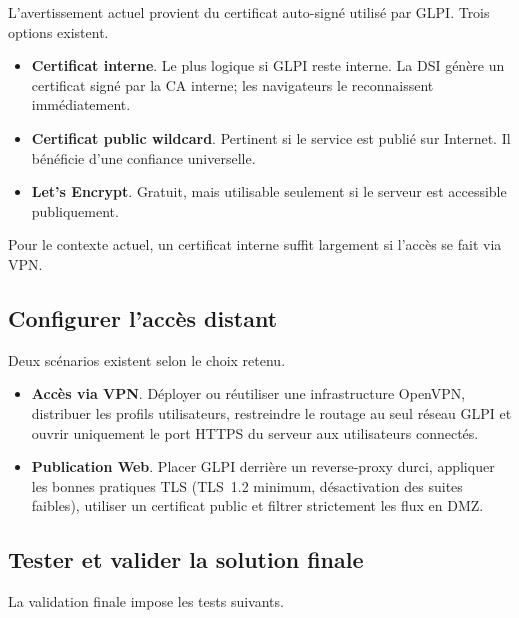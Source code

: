 \noindent L'avertissement actuel provient du certificat auto-signé utilisé par GLPI. Trois options existent.

\begin{itemize}
  \item \textbf{Certificat interne}. Le plus logique si GLPI reste interne. La DSI génère un certificat signé par la CA interne; les navigateurs le reconnaissent immédiatement.
  \item \textbf{Certificat public wildcard}. Pertinent si le service est publié sur Internet. Il bénéficie d'une confiance universelle.
  \item \textbf{Let's Encrypt}. Gratuit, mais utilisable seulement si le serveur est accessible publiquement.
\end{itemize}

\noindent Pour le contexte actuel, un certificat interne suffit largement si l'accès se fait via VPN.

\newpage

\subsection*{Configurer l'accès distant}
{}

\noindent Deux scénarios existent selon le choix retenu.

\begin{itemize}
  \item \textbf{Accès via VPN}. Déployer ou réutiliser une infrastructure OpenVPN, distribuer les profils utilisateurs, restreindre le routage au seul réseau GLPI et ouvrir uniquement le port HTTPS du serveur aux utilisateurs connectés.
  \item \textbf{Publication Web}. Placer GLPI derrière un reverse-proxy durci, appliquer les bonnes pratiques TLS (TLS~1.2 minimum, désactivation des suites faibles), utiliser un certificat public et filtrer strictement les flux en DMZ.
\end{itemize}

\medskip

\subsection*{Tester et valider la solution finale}
{}

La validation finale impose les tests suivants.

